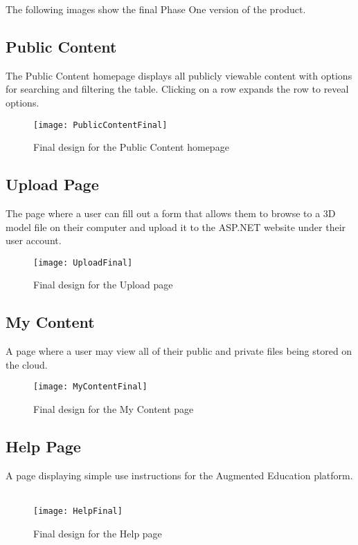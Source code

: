 \hspace{7mm}
The following images show the final Phase One version of the product. 
\subsection{Public Content}
    \hspace{7mm} The Public Content homepage displays all publicly viewable content with options for searching and filtering the table. Clicking on a row expands the row to reveal options. 
    \label{fig:final_public_content_page}
    \begin{figure}[H]
        \centering \texttt{[image: PublicContentFinal]}
        \caption{Final design for the Public Content homepage}
    \end{figure}

\subsection{Upload Page}
    \hspace{7mm} The page where a user can fill out a form 
    that allows them to browse to a 3D model file on their computer and upload
    it to the ASP.NET website under their user account.
    \ \\
    \label{fig:final_upload_page}
    \begin{figure}[H]
        \centering \texttt{[image: UploadFinal]}
        \caption{Final design for the Upload page}
    \end{figure}

\subsection{My Content}
    \hspace{7mm}
    A page where a user may view all of their public and private files being stored 
    on the cloud.
    \ \\
    \label{fig:final_my_content_page}
    \begin{figure}[H]
        \centering \texttt{[image: MyContentFinal]}
        \caption{Final design for the My Content page}
    \end{figure}

\subsection{Help Page}
    \hspace{7mm}
    A page displaying simple use instructions for the Augmented Education platform. 
    \ \\
    \label{fig:final_help_page}
    \begin{figure}[H]
        \centering \texttt{[image: HelpFinal]}
        \caption{Final design for the Help page}
    \end{figure}
